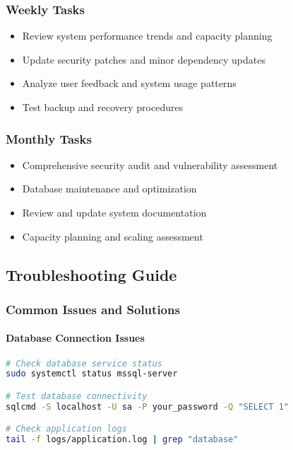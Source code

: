 \documentclass[12pt,a4paper]{article}
\begin{document}
\subsubsection{Weekly Tasks}
\begin{itemize}
    \item Review system performance trends and capacity planning
    \item Update security patches and minor dependency updates
    \item Analyze user feedback and system usage patterns
    \item Test backup and recovery procedures
\end{itemize}

\subsubsection{Monthly Tasks}
\begin{itemize}
    \item Comprehensive security audit and vulnerability assessment
    \item Database maintenance and optimization
    \item Review and update system documentation
    \item Capacity planning and scaling assessment
\end{itemize}

\subsection{Troubleshooting Guide}

\subsubsection{Common Issues and Solutions}

\paragraph{Database Connection Issues}
\begin{lstlisting}[language=bash]
# Check database service status
sudo systemctl status mssql-server

# Test database connectivity
sqlcmd -S localhost -U sa -P your_password -Q "SELECT 1"

# Check application logs
tail -f logs/application.log | grep "database"
\end{lstlisting}
\end{document}
